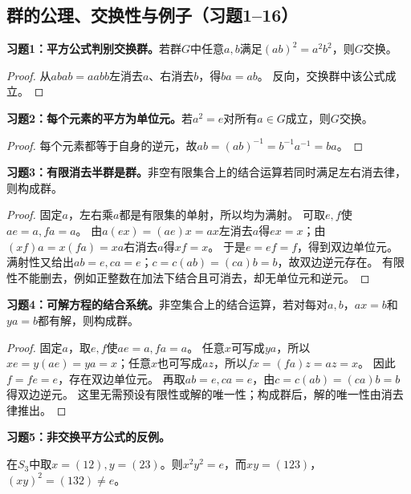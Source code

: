 
\subsection*{群的公理、交换性与例子（习题1--16）}

\begin{problem}
\textbf{习题1：平方公式判别交换群。}若群$G$中任意$a,b$满足$(ab)^2=a^2b^2$，则$G$交换。
\end{problem}
\begin{proof}
从$abab=aabb$左消去$a$、右消去$b$，得$ba=ab$。
反向，交换群中该公式成立。
\end{proof}

\begin{problem}
\textbf{习题2：每个元素的平方为单位元。}若$a^2=e$对所有$a\in G$成立，则$G$交换。
\end{problem}
\begin{proof}
每个元素都等于自身的逆元，故$ab=(ab)^{-1}=b^{-1}a^{-1}=ba$。
\end{proof}

\begin{problem}
\textbf{习题3：有限消去半群是群。}非空有限集合上的结合运算若同时满足左右消去律，则构成群。
\end{problem}
\begin{proof}
固定$a$，左右乘$a$都是有限集的单射，所以均为满射。
可取$e,f$使$ae=a,fa=a$。
由$a(ex)=(ae)x=ax$左消去$a$得$ex=x$；由$(xf)a=x(fa)=xa$右消去$a$得$xf=x$。
于是$e=ef=f$，得到双边单位元。
满射性又给出$ab=e,ca=e$；$c=c(ab)=(ca)b=b$，故双边逆元存在。
有限性不能删去，例如正整数在加法下结合且可消去，却无单位元和逆元。
\end{proof}

\begin{problem}
\textbf{习题4：可解方程的结合系统。}非空集合上的结合运算，若对每对$a,b$，$ax=b$和$ya=b$都有解，则构成群。
\end{problem}
\begin{proof}
固定$a$，取$e,f$使$ae=a,fa=a$。
任意$x$可写成$ya$，所以$xe=y(ae)=ya=x$；任意$x$也可写成$az$，所以$fx=(fa)z=az=x$。
因此$f=fe=e$，存在双边单位元。
再取$ab=e,ca=e$，由$c=c(ab)=(ca)b=b$得双边逆元。
这里无需预设有限性或解的唯一性；构成群后，解的唯一性由消去律推出。
\end{proof}

\begin{problem}
\textbf{习题5：非交换平方公式的反例。}
\end{problem}
\begin{solution}
在$S_3$中取$x=(12),y=(23)$。则$x^2y^2=e$，而$xy=(123)$，$(xy)^2=(132)\neq e$。
\end{solution}

